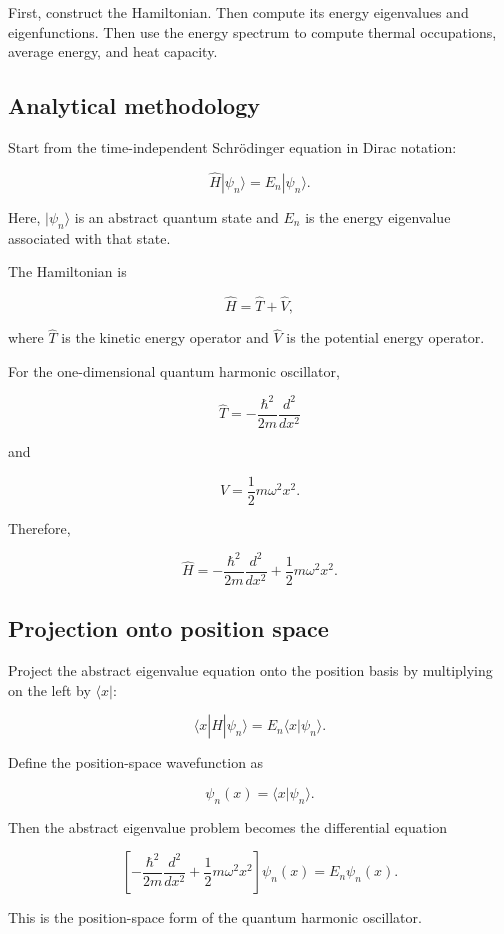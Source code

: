 First, construct the Hamiltonian. Then compute its energy eigenvalues and eigenfunctions. Then use the energy spectrum to compute thermal occupations, average energy, and heat capacity.

\subsection{Analytical methodology}

Start from the time-independent Schrödinger equation in Dirac notation:

\[
\hat{H}|\psi_n\rangle
=
E_n|\psi_n\rangle.
\]

Here, \(|\psi_n\rangle\) is an abstract quantum state and \(E_n\) is the energy eigenvalue associated with that state.

The Hamiltonian is

\[
\hat{H}
=
\hat{T}
+
\hat{V},
\]

where \(\hat{T}\) is the kinetic energy operator and \(\hat{V}\) is the potential energy operator.

For the one-dimensional quantum harmonic oscillator,

\[
\hat{T}
=
-\frac{\hbar^2}{2m}
\frac{d^2}{dx^2}
\]

and

\[
\hat{V}
=
\frac{1}{2}m\omega^2x^2.
\]

Therefore,

\[
\hat{H}
=
-\frac{\hbar^2}{2m}
\frac{d^2}{dx^2}
+
\frac{1}{2}m\omega^2x^2.
\]

\subsection{Projection onto position space}

Project the abstract eigenvalue equation onto the position basis by multiplying on the left by \(\langle x|\):

\[
\langle x|\hat{H}|\psi_n\rangle
=
E_n\langle x|\psi_n\rangle.
\]

Define the position-space wavefunction as

\[
\psi_n(x)
=
\langle x|\psi_n\rangle.
\]

Then the abstract eigenvalue problem becomes the differential equation

\[
\left[
-\frac{\hbar^2}{2m}
\frac{d^2}{dx^2}
+
\frac{1}{2}m\omega^2x^2
\right]\psi_n(x)
=
E_n\psi_n(x).
\]

This is the position-space form of the quantum harmonic oscillator.

